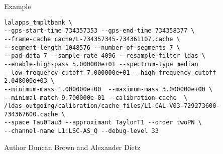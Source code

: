 \begin{entry}
\item[Example]

\begin{verbatim}
lalapps_tmpltbank \
--gps-start-time 734357353 --gps-end-time 734358377 \
--frame-cache cache/L-734357345-734361107.cache \
--segment-length 1048576 --number-of-segments 7 \
--pad-data 7 --sample-rate 4096 --resample-filter ldas \
--enable-high-pass 5.000000e+01 --spectrum-type median
--low-frequency-cutoff 7.000000e+01 --high-frequency-cutoff 2.048000e+03 \
--minimum-mass 1.000000e+00  --maximum-mass 3.000000e+00 \
--minimal-match 9.700000e-01 --calibration-cache  \
/ldas_outgoing/calibration/cache_files/L1-CAL-V03-729273600-734367600.cache \
--space Tau0Tau3 --approximant TaylorT1 --order twoPN \
--channel-name L1:LSC-AS_Q --debug-level 33

\end{verbatim}

\item[Author]
\noindent Duncan Brown and Alexander Dietz
\end{entry}
